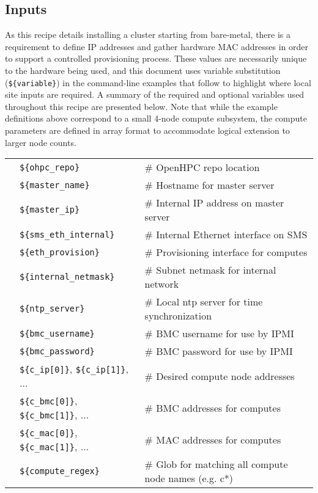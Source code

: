 
\subsection{Inputs} \label{sec:inputs}
As this recipe details installing a cluster starting from bare-metal, there is a requirement to define IP addresses and
gather hardware MAC addresses in order to support a controlled provisioning process. These values are necessarily unique
to the hardware being used, and this document uses variable substitution (\texttt{\$\{variable\}}) in the command-line
examples that follow to highlight where local site inputs are required. A summary of the required and optional variables
used throughout this recipe are presented below. Note that while the example definitions above correspond to a small
4-node compute subsystem, the compute parameters are defined in array format to accommodate logical extension to larger
node counts. \\

\vspace*{0.2cm}
\begin{tabular}{@{}>{\textbullet}l p{7cm} l}
& \texttt{\$\{ohpc\_repo\}} & {\small \# OpenHPC repo location} \\
& \texttt{\$\{master\_name\}} & {\small \# Hostname for master server} \\
& \texttt{\$\{master\_ip\}} & {\small \# Internal IP address on master server}  \\
& \texttt{\$\{sms\_eth\_internal\}} & {\small \# Internal Ethernet interface on SMS} \\
& \texttt{\$\{eth\_provision\}} & {\small \# Provisioning interface for computes} \\
& \texttt{\$\{internal\_netmask\}} & {\small \# Subnet netmask for internal network} \\
& \texttt{\$\{ntp\_server\}} & {\small \# Local ntp server for time synchronization} \\
& \texttt{\$\{bmc\_username\}} & {\small \# BMC username for use by IPMI} \\
& \texttt{\$\{bmc\_password\}} & {\small \# BMC password for use by IPMI} \\
& \texttt{\$\{c\_ip[0]\}}, \texttt{\$\{c\_ip[1]\}}, ... & {\small \# Desired compute node addresses} \\
& \texttt{\$\{c\_bmc[0]\}}, \texttt{\$\{c\_bmc[1]\}}, ... & {\small \# BMC addresses for computes} \\
& \texttt{\$\{c\_mac[0]\}}, \texttt{\$\{c\_mac[1]\}}, ... & {\small \# MAC addresses for computes} \\
& \texttt{\$\{compute\_regex\}} & {\small \# Glob for matching all compute node names (e.g. c*)} \\
\end{tabular}

